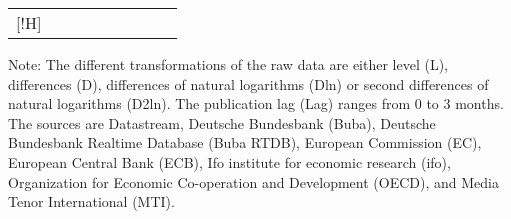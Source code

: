 \documentclass[10pt]{article}
\begin{document}
\begin{footnotesize}
\begin{longtable}{p{1.1in}|p{2.5in}|p{1in}|p{.1in}|p{.1in}|p{.1in}|p{.15in}|p{.1in}|p{.5in}}[!H]
\end{longtable}

\end{footnotesize}
{\tiny{}
Note: The different transformations of the raw data are either level (L), differences (D), differences of natural logarithms (Dln) or second differences of natural logarithms (D2ln). The publication lag (Lag) ranges from 0 to 3 months. The sources are Datastream, Deutsche Bundesbank (Buba), Deutsche Bundesbank Realtime Database (Buba RTDB), European Commission (EC), European Central Bank (ECB), Ifo institute for economic research (ifo), 
Organization for Economic Co-operation and Development (OECD), and Media Tenor International (MTI).
}

\end{document}
